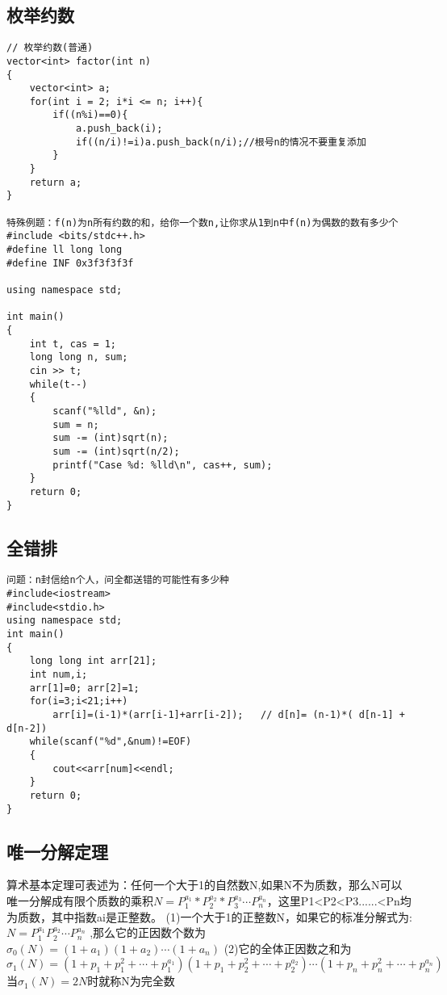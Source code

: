 \subsection{枚举约数}
\begin{lstlisting}
// 枚举约数(普通)
vector<int> factor(int n)
{
	vector<int> a;
	for(int i = 2; i*i <= n; i++){
		if((n%i)==0){
			a.push_back(i);
			if((n/i)!=i)a.push_back(n/i);//根号n的情况不要重复添加
		}
	}
	return a;
}

特殊例题：f(n)为n所有约数的和，给你一个数n,让你求从1到n中f(n)为偶数的数有多少个
#include <bits/stdc++.h>
#define ll long long
#define INF 0x3f3f3f3f

using namespace std;

int main()
{
	int t, cas = 1;
	long long n, sum;
	cin >> t;
	while(t--)
	{
		scanf("%lld", &n);
		sum = n;
		sum -= (int)sqrt(n);
		sum -= (int)sqrt(n/2);
		printf("Case %d: %lld\n", cas++, sum);
	}
	return 0;
}
\end{lstlisting}

\subsection{全错排}
\begin{lstlisting}
问题：n封信给n个人，问全都送错的可能性有多少种
#include<iostream>
#include<stdio.h>
using namespace std;
int main()
{
	long long int arr[21];
	int num,i;
	arr[1]=0; arr[2]=1;
	for(i=3;i<21;i++)
		arr[i]=(i-1)*(arr[i-1]+arr[i-2]);   // d[n]= (n-1)*( d[n-1] + d[n-2])
	while(scanf("%d",&num)!=EOF)
	{
		cout<<arr[num]<<endl;
	}
	return 0;
}
\end{lstlisting}

\subsection{唯一分解定理}
算术基本定理可表述为：任何一个大于1的自然数N,如果N不为质数，那么N可以唯一分解成有限个质数的乘积$ N=P_1^{a_1} * P_2^{a_2} * P_3^{a_3}\cdots P_n^{a_n} $，这里P1<P2<P3......<Pn均为质数，其中指数ai是正整数。
\newline
\newline
(1)一个大于1的正整数N，如果它的标准分解式为: $ N = P_{1}^{a_1}P_{2}^{a_2}\cdots P_{n}^{a_n} $ ,那么它的正因数个数为 $ \sigma_{0}(N) = (1+a_1)(1+a_2)\cdots(1+a_n) $ 
\newline
\newline
(2)它的全体正因数之和为
$$ \sigma_{1}(N)=(1+p_1+p_{1}^{2}+\cdots+p_{1}^{a_1})(1+p_1+p_{2}^{2}+\cdots+p_{2}^{a_2})\cdots(1+p_n+p_{n}^{2}+\cdots+p_{n}^{a_n})
$$
当$ \sigma_{1}(N)=2N $时就称N为完全数

